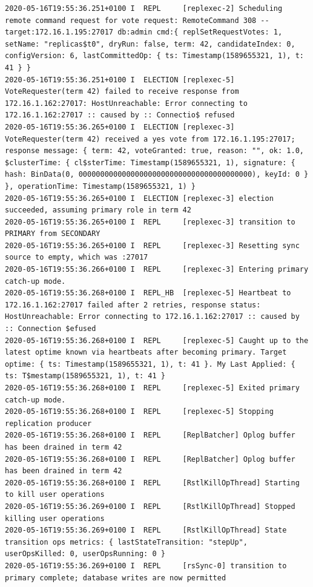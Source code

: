 \documentclass[11pt]{article}
\begin{document}
\begin{lstlisting}[language={}, basicstyle=\small]
2020-05-16T19:55:36.251+0100 I  REPL     [replexec-2] Scheduling remote command request for vote request: RemoteCommand 308 -- target:172.16.1.195:27017 db:admin cmd:{ replSetRequestVotes: 1, setName: "replicas$t0", dryRun: false, term: 42, candidateIndex: 0, configVersion: 6, lastCommittedOp: { ts: Timestamp(1589655321, 1), t: 41 } }
2020-05-16T19:55:36.251+0100 I  ELECTION [replexec-5] VoteRequester(term 42) failed to receive response from 172.16.1.162:27017: HostUnreachable: Error connecting to 172.16.1.162:27017 :: caused by :: Connectio$ refused
2020-05-16T19:55:36.265+0100 I  ELECTION [replexec-3] VoteRequester(term 42) received a yes vote from 172.16.1.195:27017; response message: { term: 42, voteGranted: true, reason: "", ok: 1.0, $clusterTime: { cl$sterTime: Timestamp(1589655321, 1), signature: { hash: BinData(0, 0000000000000000000000000000000000000000), keyId: 0 } }, operationTime: Timestamp(1589655321, 1) }
2020-05-16T19:55:36.265+0100 I  ELECTION [replexec-3] election succeeded, assuming primary role in term 42
2020-05-16T19:55:36.265+0100 I  REPL     [replexec-3] transition to PRIMARY from SECONDARY
2020-05-16T19:55:36.265+0100 I  REPL     [replexec-3] Resetting sync source to empty, which was :27017
2020-05-16T19:55:36.266+0100 I  REPL     [replexec-3] Entering primary catch-up mode.
2020-05-16T19:55:36.268+0100 I  REPL_HB  [replexec-5] Heartbeat to 172.16.1.162:27017 failed after 2 retries, response status: HostUnreachable: Error connecting to 172.16.1.162:27017 :: caused by :: Connection $efused
2020-05-16T19:55:36.268+0100 I  REPL     [replexec-5] Caught up to the latest optime known via heartbeats after becoming primary. Target optime: { ts: Timestamp(1589655321, 1), t: 41 }. My Last Applied: { ts: T$mestamp(1589655321, 1), t: 41 }
2020-05-16T19:55:36.268+0100 I  REPL     [replexec-5] Exited primary catch-up mode.
2020-05-16T19:55:36.268+0100 I  REPL     [replexec-5] Stopping replication producer
2020-05-16T19:55:36.268+0100 I  REPL     [ReplBatcher] Oplog buffer has been drained in term 42
2020-05-16T19:55:36.268+0100 I  REPL     [ReplBatcher] Oplog buffer has been drained in term 42
2020-05-16T19:55:36.268+0100 I  REPL     [RstlKillOpThread] Starting to kill user operations
2020-05-16T19:55:36.269+0100 I  REPL     [RstlKillOpThread] Stopped killing user operations
2020-05-16T19:55:36.269+0100 I  REPL     [RstlKillOpThread] State transition ops metrics: { lastStateTransition: "stepUp", userOpsKilled: 0, userOpsRunning: 0 }
2020-05-16T19:55:36.269+0100 I  REPL     [rsSync-0] transition to primary complete; database writes are now permitted
\end{lstlisting}
\end{document}
